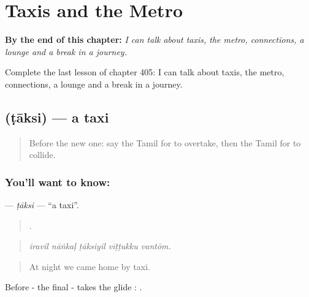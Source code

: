 
\chapter{Taxis and the Metro}
\label{ch:ta-taxis-and-the-metro}

\begin{chapteropening}
\textbf{By the end of this chapter:} \emph{I can talk about taxis, the metro, connections, a lounge and a break in a journey.}

Complete the last lesson of chapter 405: I can talk about taxis, the metro, connections, a lounge and a break in a journey.
\end{chapteropening}

\section[\texorpdfstring{\ta{டாக்ஸி} (ṭāksi)}{டாக்ஸி (ṭāksi)}]{ (ṭāksi) — a taxi}

\label{lesson:TA-C405-taksi}



\begin{quote}
Before the new one: say the Tamil for to overtake, then the Tamil for to collide.
\end{quote}

\subsection*{You'll want to know: }
\textbf{} — \emph{ṭāksi} — \textquotedblleft{}a taxi\textquotedblright{}.

\begin{quote}
    .
\end{quote}

\begin{quote}
\emph{iravil nāṅkaḷ ṭāksiyil vīṭṭukku vantōm.}
\end{quote}

\begin{quote}
At night we came home by taxi.
\end{quote}

Before - the final - takes the glide : .

